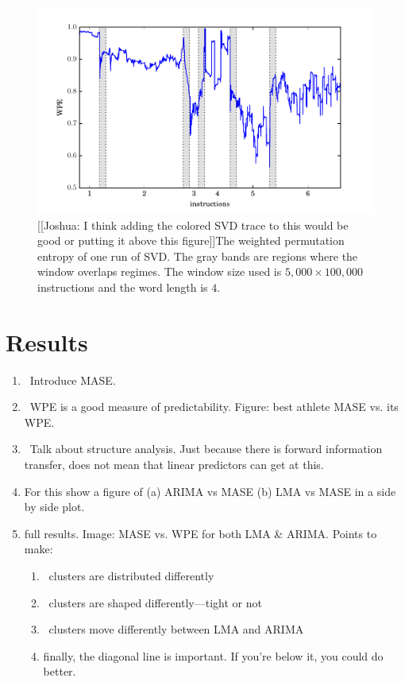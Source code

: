 \documentclass{article}
\newcommand{\cmark}{\ding{51}}
\begin{document}
\begin{figure}[htbp]
  \centering
  \includegraphics[width=1.0\textwidth]{figs/SVD_wwpe}
  \caption{[[Joshua: I think adding the colored SVD trace to this would be good or putting it above this figure]]The weighted permutation entropy of one run of SVD. The gray bands
    are regions where the window overlaps regimes. The window size used is
    $5,000 \times 100,000$ instructions and the word length is $4$.}
  \label{fig:wwpe}
\end{figure}




 \section{Results} %
 \label{sec:results}

\begin{enumerate}
\item \cmark~Introduce MASE.
\item \cmark~WPE is a good measure of predictability.  Figure: best athlete MASE vs.
its WPE.
\item \cmark~Talk about structure analysis. Just because there is forward information
transfer, does not mean that linear predictors can get at this.
\item For this show a figure of (a) ARIMA vs MASE (b) LMA vs MASE in a side by
side plot.
\item full results.  Image: MASE vs. WPE for both LMA \& ARIMA.  Points to make:
\begin{enumerate}
\item \cmark~clusters are distributed differently
\item \cmark~clusters are shaped differently---tight or not
\item \cmark~clusters move differently between LMA and ARIMA
\item finally, the diagonal line is important. If you're below it, you could do
better.
\end{enumerate}
\end{enumerate}
\end{document}
